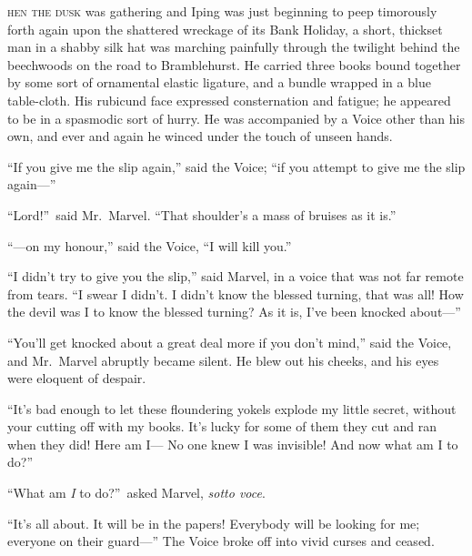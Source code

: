 \label{ch:13}
\begin{ChapterStart}
\vspace*{2\nbs}

\vspace{1.5\nbs}
\vspace{0.75\nbs}
\end{ChapterStart}

\kern-4pt\textsc{hen the dusk} was gathering and Iping was just beginning to peep timorously forth again upon the shattered wreckage of its Bank Holiday, a short, thickset man in a shabby silk hat was marching painfully through the twilight behind the beechwoods on the road to Bramblehurst. He carried three books bound together by some sort of ornamental elastic ligature, and a bundle wrapped in a blue table-cloth. His rubicund face expressed consternation and fatigue; he appeared to be in a spasmodic sort of hurry. He was accompanied by a Voice other than his own, and ever and again he winced under the touch of unseen hands.

“If you give me the slip again,” said the Voice; “if you attempt to give me the slip again—”

“Lord!”\ said Mr.\ Marvel. “That shoulder’s a mass of bruises as it is.”

“—on my honour,” said the Voice, “I will kill you.”

“I didn’t try to give you the slip,” said Marvel, in a voice that was not far remote from tears. “I swear I didn’t. I didn’t know the blessed turning, that was all! How the devil was I to know the blessed turning? As it is, I’ve been knocked about—”

“You’ll get knocked about a great deal more if you don’t mind,” said the Voice, and Mr.\ Marvel abruptly became silent. He blew out his cheeks, and his eyes were eloquent of despair.

“It’s bad enough to let these floundering yokels explode my little secret, without your cutting off with my books. It’s lucky for some of them they cut and ran when they did! Here am I— No one knew I was invisible! And now what am I to do?”

“What am \emph{I} to do?”\ asked Marvel, \emph{sotto voce}.

“It’s all about. It will be in the papers! Everybody will be looking for me; everyone on their guard—” The Voice broke off into vivid curses and ceased.

